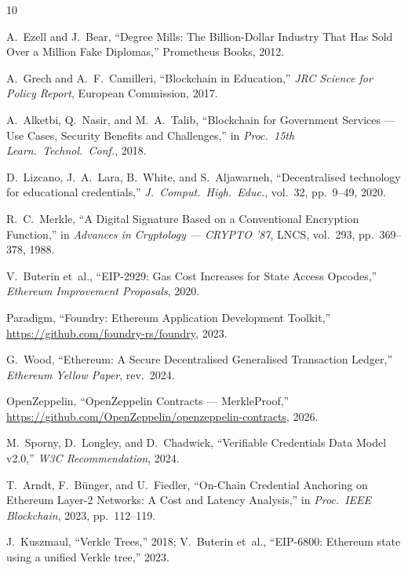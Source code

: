 \documentclass[conference]{IEEEtran}
\begin{document}
\balance
\begin{thebibliography}{10}

A.~Ezell and J.~Bear,
``Degree Mills: The Billion-Dollar Industry That Has Sold Over
a Million Fake Diplomas,''
Prometheus Books, 2012.

A.~Grech and A.~F.~Camilleri,
``Blockchain in Education,''
\emph{JRC Science for Policy Report}, European Commission,
2017.

A.~Alketbi, Q.~Nasir, and M.~A.~Talib,
``Blockchain for Government Services --- Use Cases, Security
Benefits and Challenges,''
in \emph{Proc.\ 15th Learn.\ Technol.\ Conf.}, 2018.

D.~Lizcano, J.~A.~Lara, B.~White, and S.~Aljawarneh,
``Decentralised technology for educational credentials,''
\emph{J.\ Comput.\ High.\ Educ.}, vol.~32, pp.~9--49, 2020.

R.~C.~Merkle,
``A Digital Signature Based on a Conventional Encryption
Function,''
in \emph{Advances in Cryptology --- CRYPTO '87},
LNCS, vol.~293, pp.~369--378, 1988.

V.~Buterin et~al.,
``EIP-2929: Gas Cost Increases for State Access Opcodes,''
\emph{Ethereum Improvement Proposals}, 2020.

Paradigm,
``Foundry: Ethereum Application Development Toolkit,''
\url{https://github.com/foundry-rs/foundry}, 2023.

G.~Wood,
``Ethereum: A Secure Decentralised Generalised Transaction
Ledger,''
\emph{Ethereum Yellow Paper}, rev.\ 2024.

OpenZeppelin,
``OpenZeppelin Contracts --- MerkleProof,''
\url{https://github.com/OpenZeppelin/openzeppelin-contracts},
2026.

M.~Sporny, D.~Longley, and D.~Chadwick,
``Verifiable Credentials Data Model v2.0,''
\emph{W3C Recommendation}, 2024.

T.~Arndt, F.~Bünger, and U.~Fiedler,
``On-Chain Credential Anchoring on Ethereum Layer-2
Networks: A Cost and Latency Analysis,''
in \emph{Proc.\ IEEE Blockchain}, 2023, pp.~112--119.

J.~Kuszmaul, ``Verkle Trees,'' 2018;
V.~Buterin et~al., ``EIP-6800: Ethereum state using a unified
Verkle tree,'' 2023.

\end{thebibliography}
\end{document}
